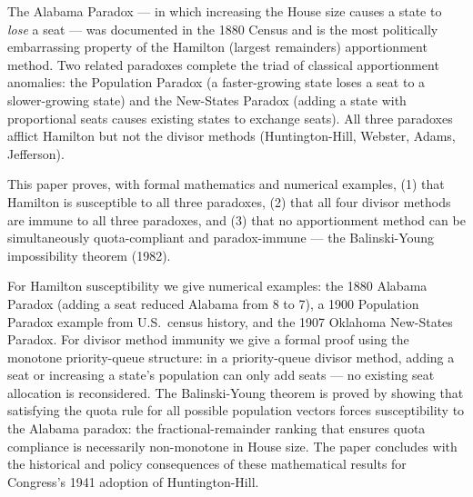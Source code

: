 The Alabama Paradox --- in which increasing the House size causes a
state to \emph{lose} a seat --- was documented in the 1880 Census
and is the most politically embarrassing property of the Hamilton
(largest remainders) apportionment method.
Two related paradoxes complete the triad of classical apportionment
anomalies: the Population Paradox (a faster-growing state loses a seat
to a slower-growing state) and the New-States Paradox (adding a state
with proportional seats causes existing states to exchange seats).
All three paradoxes afflict Hamilton but not the divisor methods
(Huntington-Hill, Webster, Adams, Jefferson).

This paper proves, with formal mathematics and numerical examples,
(1) that Hamilton is susceptible to all three paradoxes,
(2) that all four divisor methods are immune to all three paradoxes,
and (3) that no apportionment method can be simultaneously
quota-compliant and paradox-immune --- the Balinski-Young impossibility
theorem (1982).

For Hamilton susceptibility we give numerical examples:
the 1880 Alabama Paradox (adding a seat reduced Alabama from 8 to 7),
a 1900 Population Paradox example from U.S.\ census history,
and the 1907 Oklahoma New-States Paradox.
For divisor method immunity we give a formal proof using the
monotone priority-queue structure: in a priority-queue divisor method,
adding a seat or increasing a state's population can only add seats ---
no existing seat allocation is reconsidered.
The Balinski-Young theorem is proved by showing that satisfying the
quota rule for all possible population vectors forces susceptibility
to the Alabama paradox: the fractional-remainder ranking that ensures
quota compliance is necessarily non-monotone in House size.
The paper concludes with the historical and policy consequences of
these mathematical results for Congress's 1941 adoption of
Huntington-Hill.
